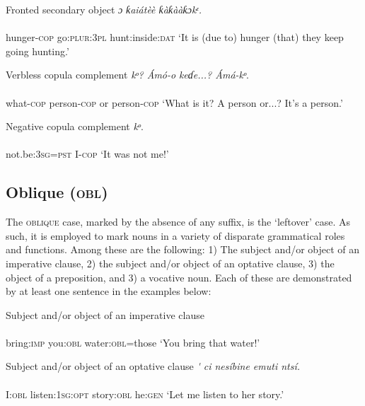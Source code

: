 Fronted secondary object
\ea\label{ex:}
\textit{ɔ}\textit{     ƙaiátèè   ƙàƙààƙɔkᵋ.} \\
    \\
hunger-\textsc{cop}   go:\textsc{plur:3pl}   hunt:inside:\textsc{dat}
\glt ‘It is (due to) hunger (that) they keep going hunting.’ 
\z





Verbless copula complement
\ea\label{ex:}
\textit{kᵒ}\textit{?   Ámó-}\textit{o}\textit{   keɗe...?   Ámá-}\textit{kᵒ}. \\
    \\
what-\textsc{cop}   person-\textsc{cop}   or     person-\textsc{cop}
\glt ‘What is it? A person or...? It’s a person.’ 
\z




Negative copula complement
\ea\label{ex:}
\textit{kᵒ}. \\
    \\
not.be:\textsc{3sg}=\textsc{pst}   I-\textsc{cop}
\glt ‘It was not me!’ 
\z






\subsection{Oblique (\textsc{obl})}


The \textsc{oblique} case, marked by the absence of any suffix, is the ‘leftover’ case. As such, it is employed to mark nouns in a variety of disparate grammatical roles and functions. Among these are the following: 1) The subject and/or object of an imperative clause, 2) the subject and/or object of an optative clause, 3) the object of a preposition, and 3) a vocative noun. Each of these are demonstrated by at least one sentence in the examples below:




Subject and/or object of an imperative clause
\ea\label{ex:}
 \\
    \\
bring:\textsc{imp}   you:\textsc{obl}   water:\textsc{obl}=those
\glt ‘You bring that water!’ 
\z

Subject and/or object of an optative clause
\ea\label{ex:}
\textit{\'{} ci   nesíbine     emuti     ntsí.} \\
    \\
I:\textsc{obl}   listen:\textsc{1sg:opt}   story:\textsc{obl}   he:\textsc{gen}
\glt ‘Let me listen to her story.’ 
\z




